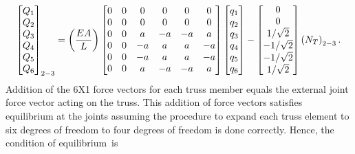 \documentclass{AeroStructure-ERJohnson}
\begin{document}
\begin{example}
\begin{align}
\left[\begin{array}{@{}l@{}}Q_{1} \\Q_{2} \\Q_{3} \\Q_{4} \\Q_{5} \\Q_{6}\end{array}\right]_{2-3} = \left(\frac{EA}{L}\right)\left[\begin{array}{@{}cccccc@{}}0 & 0 & 0 & 0 & 0 & 0 \\0 & 0 & 0 & 0 & 0 & 0 \\0 & 0 & a & -a & -a & a \\0 & 0 & -a & a & a & -a \\0 & 0 & -a & a & a & -a \\0 & 0 & a & -a & -a & a\end{array}\right]\left[\begin{array}{@{}l@{}}q_{1} \\q_{2} \\q_{3} \\q_{4} \\q_{5} \\q_{6}\end{array}\right]-\left[\begin{array}{@{}c@{}}0 \\0 \\1 / \sqrt{2} \\-1 / \sqrt{2} \\-1 / \sqrt{2} \\1 / \sqrt{2}\end{array}\right]\left(N_{T}\right)_{2-3}.
\end{align}
Addition of the 6X1 force vectors for each truss member equals the external joint force vector acting on the truss. This addition of force vectors satisfies equilibrium at the joints assuming the procedure to expand each truss element to six degrees of freedom to four degrees of freedom is done correctly. Hence, the condition of equilibrium~is\vspace*{-0.6pc}
\begin{align}\label{eq16.1e}\tag{e}

\end{align}
\end{example}
\end{document}
